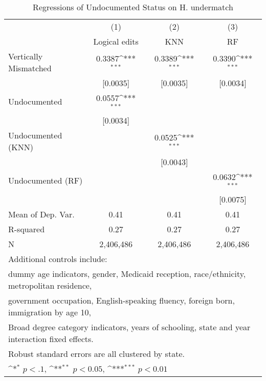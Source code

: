 \begin{table}[htbp]\centering
\def\sym#1{\ifmmode^{#1}\else\(^{#1}\)\fi}
\caption{Regressions of Undocumented Status on H. undermatch}
\begin{tabular}{l*{3}{c}}
\toprule
                    &\multicolumn{1}{c}{(1)}         &\multicolumn{1}{c}{(2)}         &\multicolumn{1}{c}{(3)}         \\
                    &Logical edits         &         KNN         &          RF         \\
\midrule
Vertically Mismatched&      0.3387\sym{***}&      0.3389\sym{***}&      0.3390\sym{***}\\
                    &    [0.0035]         &    [0.0035]         &    [0.0034]         \\
\addlinespace
Undocumented        &      0.0557\sym{***}&                     &                     \\
                    &    [0.0034]         &                     &                     \\
\addlinespace
Undocumented (KNN)  &                     &      0.0525\sym{***}&                     \\
                    &                     &    [0.0043]         &                     \\
\addlinespace
Undocumented (RF)   &                     &                     &      0.0632\sym{***}\\
                    &                     &                     &    [0.0075]         \\
\midrule
Mean of Dep. Var.   &        0.41         &        0.41         &        0.41         \\
R-squared           &        0.27         &        0.27         &        0.27         \\
N                   &   2,406,486         &   2,406,486         &   2,406,486         \\
\bottomrule
\multicolumn{4}{l}{\footnotesize Additional controls include:}\\
\multicolumn{4}{l}{\footnotesize dummy age indicators, gender, Medicaid reception, race/ethnicity, metropolitan residence,}\\
\multicolumn{4}{l}{\footnotesize government occupation, English-speaking fluency, foreign born, immigration by age 10,}\\
\multicolumn{4}{l}{\footnotesize Broad degree category indicators, years of schooling, state and year interaction fixed effects.}\\
\multicolumn{4}{l}{\footnotesize Robust standard errors are all clustered by state.}\\
\multicolumn{4}{l}{\footnotesize \sym{*} \(p<.1\), \sym{**} \(p<0.05\), \sym{***} \(p<0.01\)}\\
\end{tabular}
\end{table}
